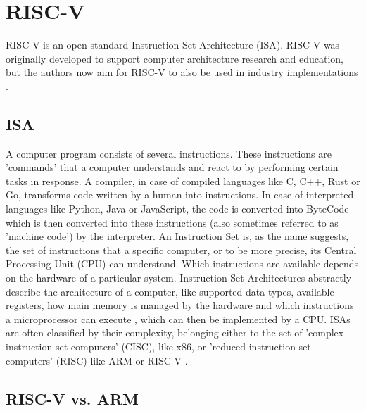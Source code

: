 

\section{RISC-V}

RISC-V \cite{riscv} is an open standard Instruction Set Architecture (ISA).
RISC-V was originally developed to support computer architecture research and education, but the authors now
aim for RISC-V to also be used in industry implementations \cite{riscv_spec}.

\subsection{ISA}

A computer program consists of several instructions.
These instructions are 'commands' that a computer understands and react to by performing certain tasks in response.
A compiler, in case of compiled languages like C, C++, Rust or Go, transforms code written by a human into instructions.
In case of interpreted languages like Python, Java or JavaScript, the code is converted into ByteCode which is then converted into
these instructions (also sometimes referred to as 'machine code') by the interpreter.
An Instruction Set is, as the name suggests, the set of instructions that a specific computer, or to be more precise,
its Central Processing Unit (CPU) can understand.
Which instructions are available depends on the hardware of a particular system.
Instruction Set Architectures abstractly describe the architecture of a computer,
like supported data types, available registers, how main memory is managed by the hardware and
which instructions  a microprocessor can execute \cite{isa}, which can then be implemented by a CPU.
ISAs are often classified by their complexity, belonging either to the set of 'complex instruction set computers' (CISC), like x86,
or 'reduced instruction set computers' (RISC) like ARM \cite{arm_architecture} or RISC-V \cite{riscv_spec}.

\subsection{RISC-V vs. ARM}

